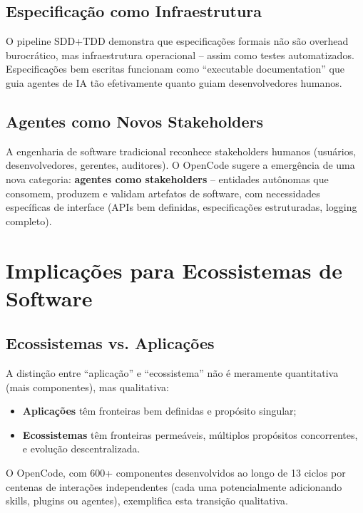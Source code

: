 \documentclass[12pt,a4paper,sumario=tradicional]{abntex2}
\begin{document}
\subsection{Especificação como Infraestrutura}

O pipeline SDD+TDD demonstra que especificações formais não são overhead burocrático, mas infraestrutura operacional -- assim como testes automatizados. Especificações bem escritas funcionam como ``executable documentation'' que guia agentes de IA tão efetivamente quanto guiam desenvolvedores humanos.

\subsection{Agentes como Novos Stakeholders}

A engenharia de software tradicional reconhece stakeholders humanos (usuários, desenvolvedores, gerentes, auditores). O OpenCode sugere a emergência de uma nova categoria: \textbf{agentes como stakeholders} -- entidades autônomas que consomem, produzem e validam artefatos de software, com necessidades específicas de interface (APIs bem definidas, especificações estruturadas, logging completo).

\section{Implicações para Ecossistemas de Software}

\subsection{Ecossistemas vs. Aplicações}

A distinção entre ``aplicação'' e ``ecossistema'' não é meramente quantitativa (mais componentes), mas qualitativa:

\begin{itemize}
    \item \textbf{Aplicações} têm fronteiras bem definidas e propósito singular;
    \item \textbf{Ecossistemas} têm fronteiras permeáveis, múltiplos propósitos concorrentes, e evolução descentralizada.
\end{itemize}

O OpenCode, com 600+ componentes desenvolvidos ao longo de 13 ciclos por centenas de interações independentes (cada uma potencialmente adicionando skills, plugins ou agentes), exemplifica esta transição qualitativa.
\end{document}
